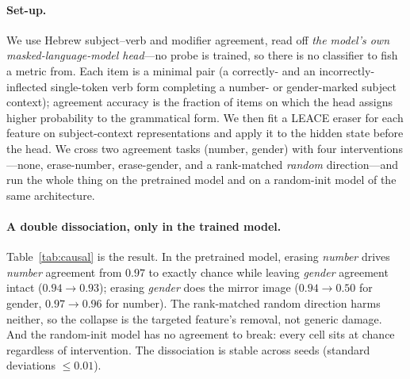 \documentclass[11pt]{article}
\begin{document}
\paragraph{Set-up.}
We use Hebrew subject--verb and modifier agreement, read off \emph{the model's own
masked-language-model head}---no probe is trained, so there is no classifier to
fish a metric from. Each item is a minimal pair (a correctly- and an
incorrectly-inflected single-token verb form completing a number- or
gender-marked subject context); agreement accuracy is the fraction of items on
which the head assigns higher probability to the grammatical form. We then fit a
LEACE eraser for each feature on subject-context representations and apply it to
the hidden state before the head. We cross two agreement tasks (number, gender) with
four interventions---none, erase-number, erase-gender, and a rank-matched
\emph{random} direction---and run the whole thing on the pretrained model and on a
random-init model of the same architecture.

\paragraph{A double dissociation, only in the trained model.}
Table~\ref{tab:causal} is the result. In the pretrained model, erasing
\emph{number} drives \emph{number} agreement from $0.97$ to exactly chance while
leaving \emph{gender} agreement intact ($0.94\!\to\!0.93$); erasing \emph{gender}
does the mirror image ($0.94\!\to\!0.50$ for gender, $0.97\!\to\!0.96$ for number).
The rank-matched random direction harms neither, so the collapse is the targeted
feature's removal, not generic damage. And the random-init model has no agreement
to break: every cell sits at chance regardless of intervention. The dissociation is
stable across seeds (standard deviations $\le 0.01$).

\begin{table}[t]
  \centering
  \small
  
  \caption{Causal agreement test (mean${}\pm{}$SD over three seeds). Agreement
  accuracy is read from AlephBERT's masked-LM head (no trained probe). In the
  pretrained model each eraser collapses \emph{only} its own agreement task to
  chance while a rank-matched random direction spares both; the random-init model
  has no agreement to begin with. Geometry is necessary for separability, but only
  the trained model \emph{uses} the subspace.}
  \label{tab:causal}
\end{table}
\end{document}
